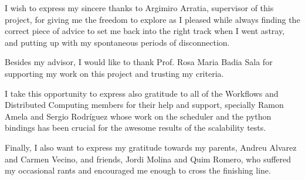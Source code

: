 \documentclass[
11pt, %
english, %
singlespacing, %
headsepline, %
]{MastersDoctoralThesis} %
\begin{document}

\begin{acknowledgements}
\addchaptertocentry{\acknowledgementname} %
I wish to express my sincere thanks to Argimiro Arratia, supervisor of this project, for giving me the freedom to explore as I pleased while always finding the correct piece of advice to set me back into the right track when I went astray, and putting up with my spontaneous periods of disconnection.

Besides my advisor, I would like to thank Prof. Rosa Maria Badia Sala for supporting my work on this project and trusting my criteria.

I take this opportunity to express also gratitude to all of the Workflows and Distributed Computing members for their help and support, specially Ramon Amela and Sergio Rodríguez whose work on the scheduler and the python bindings has been crucial for the awesome results of the scalability tests.

Finally, I also want to express my gratitude towards my parents, Andreu Alvarez and Carmen Vecino, and friends, Jordi Molina and Quim Romero, who suffered my occasional rants and encouraged me enough to cross the finishing line.
\end{acknowledgements}


\tableofcontents %

\listoffigures %

\listoftables %

\end{document}
